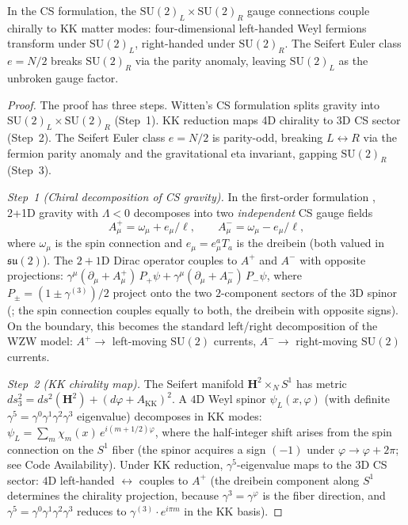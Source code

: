 \begin{proposition}
\label{prop:chiral-su2}
In the CS formulation, the $\mathrm{SU}(2)_L \times \mathrm{SU}(2)_R$
gauge connections couple chirally to KK matter modes:
four-dimensional left-handed Weyl fermions transform under
$\mathrm{SU}(2)_L$, right-handed under $\mathrm{SU}(2)_R$.
The Seifert Euler class $e = N/2$ breaks
$\mathrm{SU}(2)_R$ via the parity anomaly, leaving
$\mathrm{SU}(2)_L$ as the unbroken gauge factor.
\end{proposition}

\begin{proof}
The proof has three steps.
Witten's CS formulation splits gravity into $\mathrm{SU}(2)_L
\times \mathrm{SU}(2)_R$ (Step~1).
KK reduction maps 4D chirality to 3D CS sector (Step~2).
The Seifert Euler class $e = N/2$ is parity-odd, breaking
$L \leftrightarrow R$ via the fermion parity anomaly and
the gravitational eta invariant, gapping $\mathrm{SU}(2)_R$
(Step~3).

\emph{Step~1 (Chiral decomposition of CS gravity).}
In the first-order formulation \citep{Witten1988},
2+1D gravity with $\Lambda < 0$ decomposes into two
\emph{independent} CS gauge fields
\begin{equation}\label{eq:A-pm}
  A^+_\mu = \omega_\mu + e_\mu/\ell, \qquad
  A^-_\mu = \omega_\mu - e_\mu/\ell,
\end{equation}
where $\omega_\mu$ is the spin connection and $e_\mu = e_\mu^a T_a$
is the dreibein (both valued in $\mathfrak{su}(2)$).
The $2{+}1$D Dirac operator couples to $A^+$ and $A^-$ with opposite
projections:
$\gamma^\mu(\partial_\mu + A^+_\mu)\,P_+ \psi
+ \gamma^\mu(\partial_\mu + A^-_\mu)\,P_- \psi$,
where $P_\pm = (1 \pm \gamma^{(3)})/2$ project onto the two
$2$-component sectors of the $3$D spinor
(\citealt{Witten1988}; the spin connection couples equally
to both, the dreibein with opposite signs).
On the boundary, this becomes the standard left/right
decomposition of the WZW model:
$A^+ \to$ left-moving $\mathrm{SU}(2)$ currents,
$A^- \to$ right-moving $\mathrm{SU}(2)$ currents.

\emph{Step~2 (KK chirality map).}
The Seifert manifold $\mathbf{H}^2 \times_N S^1$ has metric
$ds^2_3 = ds^2(\mathbf{H}^2) + (d\varphi + A_{\mathrm{KK}})^2$.
A $4$D Weyl spinor $\psi_L(x,\varphi)$ (with definite
$\gamma^5 = \gamma^0\gamma^1\gamma^2\gamma^3$ eigenvalue)
decomposes in KK modes:
$\psi_L = \sum_m \chi_m(x)\,e^{i(m+1/2)\varphi}$,
where the half-integer shift arises from the spin connection
on the $S^1$ fiber (the spinor acquires a sign $(-1)$ under
$\varphi \to \varphi + 2\pi$;
see Code Availability).
Under KK reduction, $\gamma^5$-eigenvalue maps to the
$3$D CS sector: $4$D left-handed $\leftrightarrow$ couples to $A^+$
(the dreibein component along $S^1$ determines the chirality
projection, because $\gamma^3 = \gamma^\varphi$ is the fiber direction,
and $\gamma^5 = \gamma^0\gamma^1\gamma^2\gamma^3$ reduces to
$\gamma^{(3)} \cdot e^{i\pi m}$ in the KK basis).


\end{proof}
